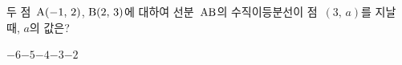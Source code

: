 두 점~$\mathrm{A}(-1,\,2)$, $\mathrm{B}(2,\,3)$에 대하여 선분~$\mathrm{AB}$의 수직이등분선이 점~$(3,\,a)$를 지날 때, $a$의 값은?
\begin{choices32}{$-6$}{$-5$}{$-4$}{$-3$}{$-2$}\end{choices32}
